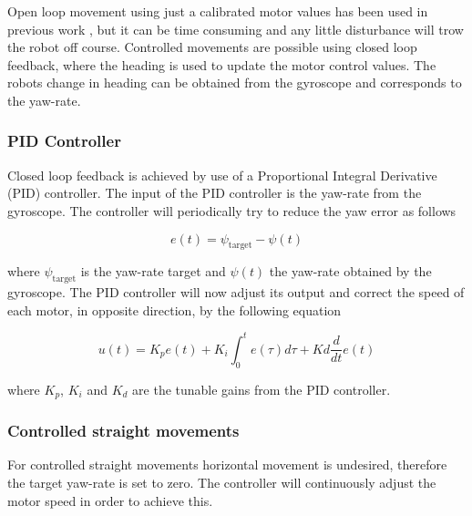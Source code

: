 Open loop movement using just a calibrated motor values has been used in previous work \cite{legoc_uist_2016}, but it can be time consuming and any little disturbance will trow the robot off course.
Controlled movements are possible using closed loop feedback, where the heading is used to update the motor control values.
The robots change in heading can be obtained from the gyroscope and corresponds to the yaw-rate.

\subsubsection{PID Controller}


Closed loop feedback is achieved by use of a Proportional Integral Derivative (PID) controller.
The input of the PID controller is the yaw-rate from the gyroscope.
The controller will periodically try to reduce the yaw error as follows

\begin{equation}
	e(t) = \psi_{\text{target}} - \psi(t)
\end{equation}

\noindent
where $\psi_{\text{target}}$ is the yaw-rate target and $\psi(t)$ the yaw-rate obtained by the gyroscope.
The PID controller will now adjust its output and correct the speed of each motor, in opposite direction, by the following equation

\begin{equation}
u(t) = K_{p}e(t) + K_{i} \int_{0}^{t}e(\tau)d\tau + Kd\frac{d}{dt}e(t)
\end{equation}

\noindent
where $K_{p}$, $K_{i}$ and $K_{d}$ are the tunable gains from the PID controller.

\subsubsection{Controlled straight movements}

For controlled straight movements horizontal movement is undesired, therefore the target yaw-rate is set to zero.
The controller will continuously adjust the motor speed in order to achieve this.

